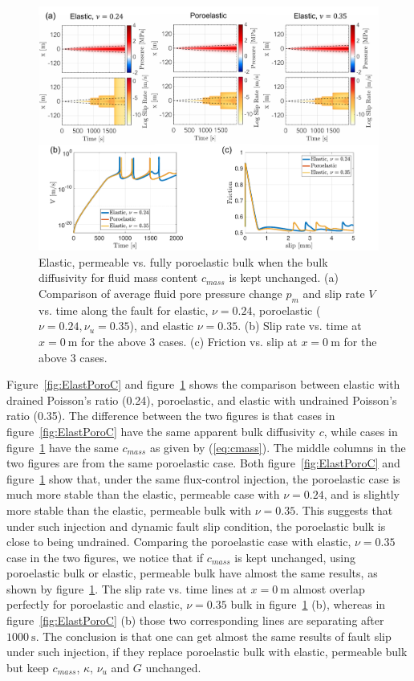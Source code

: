 \begin{figure}[htbp]
    \centering
    \includegraphics[width=1.0\textwidth]{figures/ElastPoro_cmass.pdf}
    \caption{Elastic, permeable vs. fully poroelastic bulk when the bulk diffusivity for fluid mass content $c_{mass}$ is kept unchanged. (a) Comparison of average fluid pore pressure change $p_m$ and slip rate $V$ vs. time along the fault for elastic, $\nu = 0.24$, poroelastic ($\nu = 0.24, \nu_u = 0.35$), and elastic $\nu = 0.35$. 
    (b) Slip rate vs. time at $x = 0\ \mathrm{m}$ for the above 3 cases. 
    (c) Friction vs. slip at $x = 0\ \mathrm{m}$ for the above 3 cases.}
    \label{fig:ElastPoroCMass}
\end{figure}

Figure~\ref{fig:ElastPoroC} and figure~\ref{fig:ElastPoroCMass} shows the comparison between elastic with drained Poisson's ratio (0.24), 
poroelastic, 
and elastic with undrained Poisson's ratio (0.35). 
The difference between the two figures is that cases in figure~\ref{fig:ElastPoroC} have the same apparent bulk diffusivity $c$, 
while cases in figure~\ref{fig:ElastPoroCMass} have the same $c_{mass}$ as given by (\ref{eq:cmass}). 
The middle columns in the two figures are from the same poroelastic case. 
Both figure~\ref{fig:ElastPoroC} and figure~\ref{fig:ElastPoroCMass} show that, 
under the same flux-control injection, 
the poroelastic case is much more stable than the elastic, permeable case with $\nu = 0.24$, 
and is slightly more stable than the elastic, 
permeable bulk with $\nu = 0.35$. 
This suggests that under such injection and dynamic fault slip condition, 
the poroelastic bulk is close to being undrained. 
Comparing the poroelastic case with elastic, $\nu = 0.35$ case in the two figures, 
we notice that if $c_{mass}$ is kept unchanged, 
using poroelastic bulk or elastic, permeable bulk have almost the same results, 
as shown by figure~\ref{fig:ElastPoroCMass}. 
The slip rate vs. time lines at $x = 0\ \mathrm{m}$ almost overlap perfectly for poroelastic and elastic, $\nu = 0.35$ bulk in figure~\ref{fig:ElastPoroCMass} (b), 
whereas in figure~\ref{fig:ElastPoroC} (b) those two corresponding lines are separating after $1000\ \mathrm{s}$. 
The conclusion is that one can get almost the same results of fault slip under such injection, 
if they replace poroelastic bulk with elastic, 
permeable bulk but keep $c_{mass}$, $\kappa$, $\nu_u$ and $G$ unchanged. 


